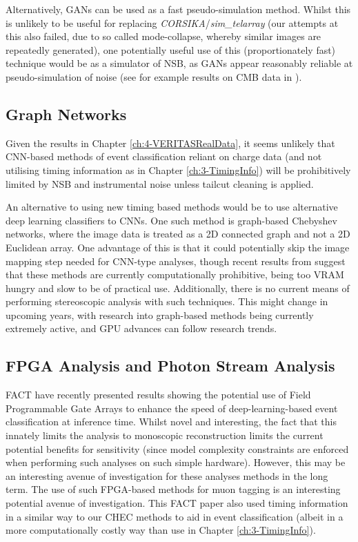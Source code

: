 Alternatively, GANs can be used as a fast pseudo-simulation method. Whilst this is unlikely to be useful for replacing \textit{CORSIKA}/\textit{sim\_telarray} (our attempts at this also failed, due to so called mode-collapse, whereby similar images are repeatedly generated), one potentially useful use of this (proportionately fast) technique would be as a simulator of NSB, as GANs appear reasonably reliable at pseudo-simulation of noise (see for example results on CMB data in \cite{darshgan}). 

\subsection{Graph Networks}
Given the results in Chapter \ref{ch:4-VERITASRealData}, it seems unlikely that CNN-based methods of event classification reliant on charge data (and not utilising timing information as in Chapter \ref{ch:3-TimingInfo}) will be prohibitively limited by NSB and instrumental noise unless tailcut cleaning is applied.

An alternative to using new timing based methods would be to use alternative deep learning classifiers to CNNs. One such method is graph-based Chebyshev networks, where the image data is treated as a 2D connected graph and not a 2D Euclidean array. One advantage of this is that it could potentially skip the image mapping step needed for CNN-type analyses, though recent results from \cite{adithesis} suggest that these methods are currently computationally prohibitive, being too VRAM hungry and slow to be of practical use. Additionally, there is no current means of performing stereoscopic analysis with such techniques. This might change in upcoming years, with research into graph-based methods being currently extremely active, and GPU advances can follow research trends.

\subsection{FPGA Analysis and Photon Stream Analysis}

FACT have recently presented results showing the potential use of Field Programmable Gate Arrays to enhance the speed of deep-learning-based event classification at inference time. Whilst novel and interesting, the fact that this innately limits the analysis to monoscopic reconstruction limits the current potential benefits for sensitivity (since model complexity constraints are enforced when performing such analyses on such simple hardware). However, this may be an interesting avenue of investigation for these analyses methods in the long term. The use of such FPGA-based methods for muon tagging is an interesting potential avenue of investigation. This FACT paper also used timing information in a similar way to our CHEC methods to aid in event classification (albeit in a more computationally costly way than use in Chapter \ref{ch:3-TimingInfo}).

